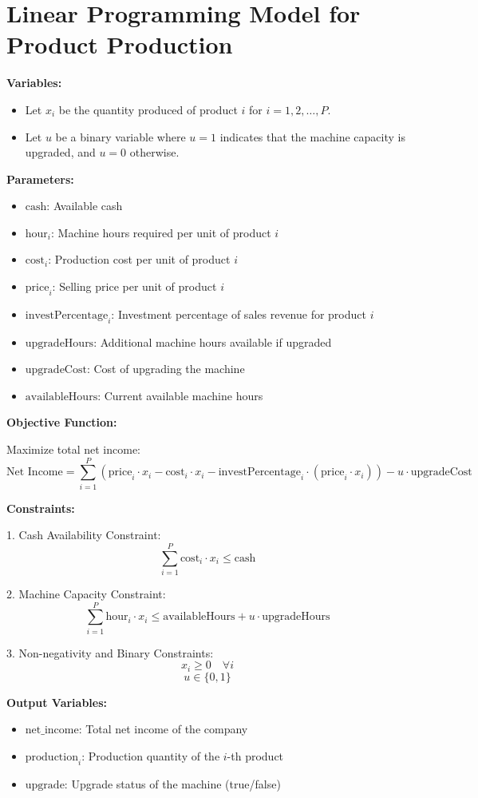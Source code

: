 \documentclass{article}
\begin{document}
\section*{Linear Programming Model for Product Production}

\textbf{Variables:}
\begin{itemize}
    \item Let \( x_i \) be the quantity produced of product \( i \) for \( i = 1, 2, \ldots, P \).
    \item Let \( u \) be a binary variable where \( u = 1 \) indicates that the machine capacity is upgraded, and \( u = 0 \) otherwise.
\end{itemize}

\textbf{Parameters:}
\begin{itemize}
    \item \( \text{cash} \): Available cash
    \item \( \text{hour}_i \): Machine hours required per unit of product \( i \)
    \item \( \text{cost}_i \): Production cost per unit of product \( i \)
    \item \( \text{price}_i \): Selling price per unit of product \( i \)
    \item \( \text{investPercentage}_i \): Investment percentage of sales revenue for product \( i \)
    \item \( \text{upgradeHours} \): Additional machine hours available if upgraded
    \item \( \text{upgradeCost} \): Cost of upgrading the machine
    \item \( \text{availableHours} \): Current available machine hours
\end{itemize}

\textbf{Objective Function:}

Maximize total net income:
\[
\text{Net Income} = \sum_{i=1}^{P} \left( \text{price}_i \cdot x_i - \text{cost}_i \cdot x_i - \text{investPercentage}_i \cdot (\text{price}_i \cdot x_i) \right) - u \cdot \text{upgradeCost}
\]

\textbf{Constraints:}

1. Cash Availability Constraint:
\[
\sum_{i=1}^{P} \text{cost}_i \cdot x_i \leq \text{cash}
\]

2. Machine Capacity Constraint:
\[
\sum_{i=1}^{P} \text{hour}_i \cdot x_i \leq \text{availableHours} + u \cdot \text{upgradeHours}
\]

3. Non-negativity and Binary Constraints:
\[
x_i \geq 0 \quad \forall i
\]
\[
u \in \{0, 1\}
\]

\textbf{Output Variables:}
\begin{itemize}
    \item \( \text{net\_income} \): Total net income of the company
    \item \( \text{production}_i \): Production quantity of the \( i \)-th product
    \item \( \text{upgrade} \): Upgrade status of the machine (true/false)
\end{itemize}
\end{document}
